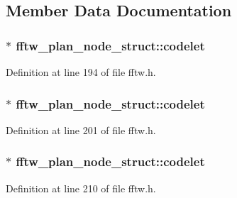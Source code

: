 \subsection{Member Data Documentation}
\subsubsection[{\texorpdfstring{codelet}{codelet}}]{$\ast$ fftw\+\_\+plan\+\_\+node\+\_\+struct\+::codelet}\hypertarget{structfftw__plan__node__struct_a25c03594d9b1cbb6233d09b3bc0af418}{}\label{structfftw__plan__node__struct_a25c03594d9b1cbb6233d09b3bc0af418}


Definition at line 194 of file fftw.\+h.

\subsubsection[{\texorpdfstring{codelet}{codelet}}]{$\ast$ fftw\+\_\+plan\+\_\+node\+\_\+struct\+::codelet}\hypertarget{structfftw__plan__node__struct_a5974d49a3f2ae9c629156dbfc3effb20}{}\label{structfftw__plan__node__struct_a5974d49a3f2ae9c629156dbfc3effb20}


Definition at line 201 of file fftw.\+h.

\subsubsection[{\texorpdfstring{codelet}{codelet}}]{$\ast$ fftw\+\_\+plan\+\_\+node\+\_\+struct\+::codelet}\hypertarget{structfftw__plan__node__struct_a1b5991ee0110b2cf7447078aa0af3a2c}{}\label{structfftw__plan__node__struct_a1b5991ee0110b2cf7447078aa0af3a2c}


Definition at line 210 of file fftw.\+h.

